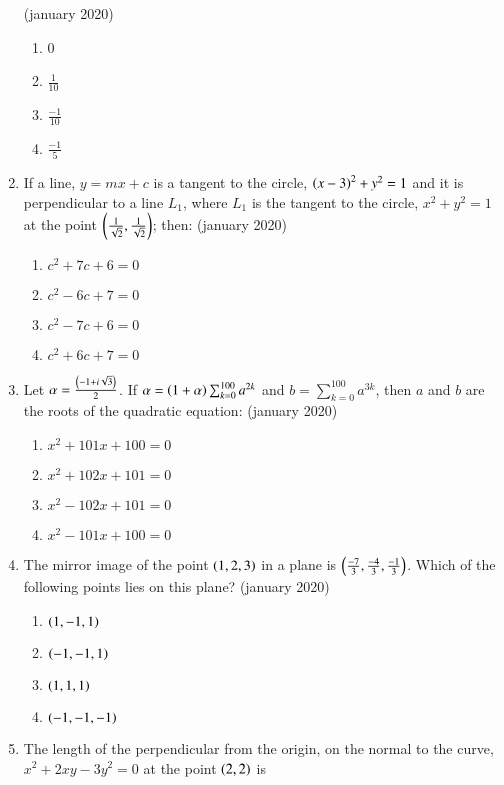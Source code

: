 \documentclass[journal,12pt,onecolumn]{IEEEtran}
\theoremstyle{remark}
\begin{document}
\begin{enumerate}
	    \hfill{(january 2020)}
    \begin{enumerate}
        \item 0
        \item $\frac{1}{10}$
        \item $\frac{-1}{10}$
        \item $\frac{-1}{5}$
    \end{enumerate}
    \item If a line, $y= mx + c$ is a tangent to the circle, $\left(x - 3\right)^2 + y^2 = 1$ and it is perpendicular to a line $L_1$, where $L_1$ is the tangent to the circle, $x^2 + y^2 = 1$ at the point $\left( \frac{1}{\sqrt{2}} , \frac{1}{\sqrt{2}}\right)$; then:
  \hfill{(january 2020)}
  \begin{enumerate}
        \item $c^2 + 7c + 6 = 0 $
        \item $c^2 - 6c + 7 = 0 $
        \item $c^2 - 7c + 6 = 0 $
        \item $c^2 + 6c + 7 = 0 $
    \end{enumerate}
    \item Let $\alpha=\frac{\left(-1+i\sqrt{3}\right)}{2}$. If $\alpha=\left(1+\alpha\right)\sum_{k=0}^{100}a^{2k}$ and $b=\sum_{k=0}^{100} a^{3k}$, then $a$ and $b$ are the roots of the quadratic equation:
  \hfill{(january 2020)}
  \begin{enumerate}
        \item $x^2+101x+100=0$
        \item $x^2+102x+101=0$
        \item $x^2-102x+101=0$
        \item $x^2-101x+100=0$
    \end{enumerate}
    \item  The mirror image of the point $\left(1, 2, 3\right)$ in a plane is $\left(\frac{-7}{3}, \frac{-4}{3} , \frac{-1}{3} \right)$. Which of the following points lies on this plane?
\hfill{(january 2020)}
    \begin{enumerate}
        \item $\left(1,-1,1\right)$
         \item $\left(-1,-1,1\right)$
          \item $\left(1,1,1\right)$
         \item $\left(-1,-1,-1\right)$  
    \end{enumerate}
    \item The length of the perpendicular from the origin, on the normal to the curve,$x^2 + 2xy - 3y^2 = 0$ at the point $\left(2, 2\right)$ is

\end{enumerate}
\end{document}

